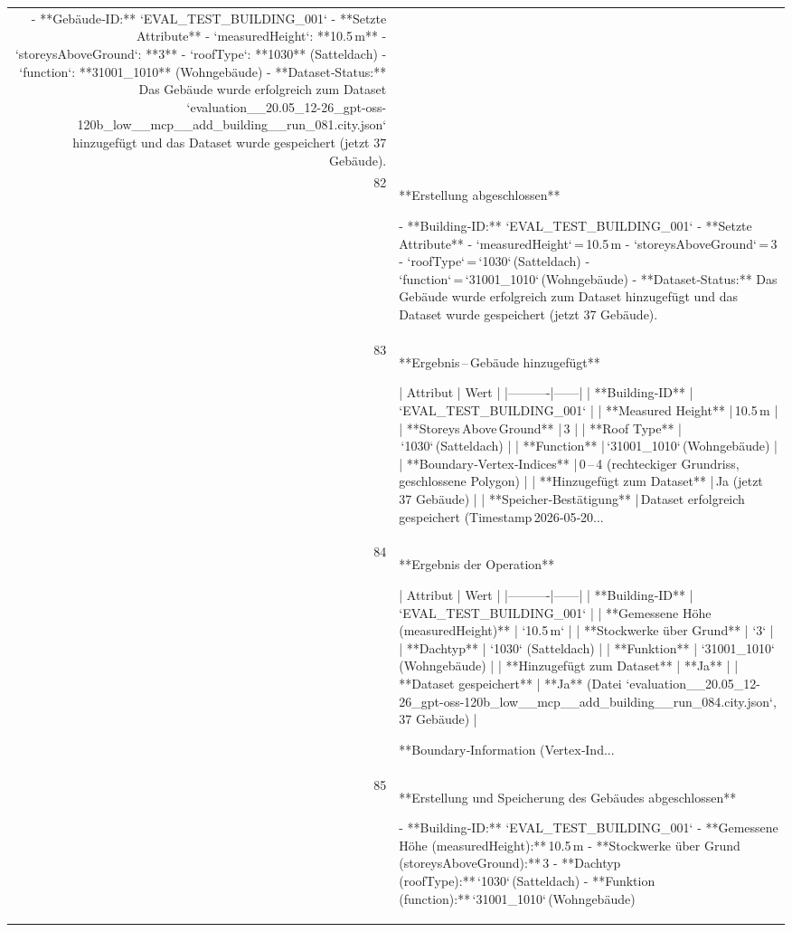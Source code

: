 \documentclass[a4paper,11pt]{article}
\begin{document}
\begin{table}[ht]
\begin{tabular}{r p{12cm}}
- **Gebäude‑ID:** `EVAL\_TEST\_BUILDING\_001`  
- **Setzte Attribute**  
  - `measuredHeight`: **10.5 m**  
  - `storeysAboveGround`: **3**  
  - `roofType`: **1030** (Satteldach)  
  - `function`: **31001\_1010** (Wohngebäude)  
- **Dataset‑Status:** Das Gebäude wurde erfolgreich zum Dataset `evaluation\_\_20.05\_12-26\_gpt-oss-120b\_low\_\_mcp\_\_add\_building\_\_run\_081.city.json` hinzugefügt und das Dataset wurde gespeichert (jetzt 37 Gebäude). \\
82 & **Erstellung abgeschlossen**

- **Building‑ID:** `EVAL\_TEST\_BUILDING\_001`  
- **Setzte Attribute**  
  - `measuredHeight` = 10.5 m  
  - `storeysAboveGround` = 3  
  - `roofType` = `1030` (Satteldach)  
  - `function` = `31001\_1010` (Wohngebäude)  
- **Dataset‑Status:** Das Gebäude wurde erfolgreich zum Dataset hinzugefügt und das Dataset wurde gespeichert (jetzt 37 Gebäude). \\
83 & **Ergebnis – Gebäude hinzugefügt**

| Attribut | Wert |
|----------|------|
| **Building‑ID** | `EVAL\_TEST\_BUILDING\_001` |
| **Measured Height** | 10.5 m |
| **Storeys Above Ground** | 3 |
| **Roof Type** | `1030` (Satteldach) |
| **Function** | `31001\_1010` (Wohngebäude) |
| **Boundary‑Vertex‑Indices** | 0 – 4 (rechteckiger Grundriss, geschlossene Polygon) |
| **Hinzugefügt zum Dataset** | Ja (jetzt 37 Gebäude) |
| **Speicher‑Bestätigung** | Dataset erfolgreich gespeichert (Timestamp 2026‑05‑20... \\
84 & **Ergebnis der Operation**

| Attribut | Wert |
|----------|------|
| **Building‑ID** | `EVAL\_TEST\_BUILDING\_001` |
| **Gemessene Höhe (measuredHeight)** | `10.5 m` |
| **Stockwerke über Grund** | `3` |
| **Dachtyp** | `1030` (Satteldach) |
| **Funktion** | `31001\_1010` (Wohngebäude) |
| **Hinzugefügt zum Dataset** | **Ja** |
| **Dataset gespeichert** | **Ja** (Datei `evaluation\_\_20.05\_12-26\_gpt-oss-120b\_low\_\_mcp\_\_add\_building\_\_run\_084.city.json`, 37 Gebäude) |

**Boundary‑Information (Vertex‑Ind... \\
85 & **Erstellung und Speicherung des Gebäudes abgeschlossen**

- **Building‑ID:** `EVAL\_TEST\_BUILDING\_001`  
- **Gemessene Höhe (measuredHeight):** 10.5 m  
- **Stockwerke über Grund (storeysAboveGround):** 3  
- **Dachtyp (roofType):** `1030` (Satteldach)  
- **Funktion (function):** `31001\_1010` (Wohngebäude)  


\end{tabular}
\end{table}
\end{document}
